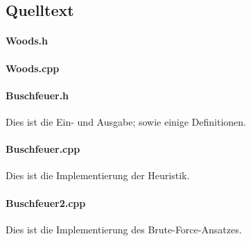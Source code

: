 \subsection{Quelltext}
\paragraph{Woods.h} \mbox{}

{\small

}

\paragraph{Woods.cpp}\mbox{}

{\small

}

\paragraph{Buschfeuer.h} Dies ist die Ein- und Ausgabe; sowie einige Definitionen.

{\small

}

\paragraph{Buschfeuer.cpp} Dies ist die Implementierung der Heuristik.

{\small

}

\paragraph{Buschfeuer2.cpp} Dies ist die Implementierung des Brute-Force-Ansatzes.

{\small

}
